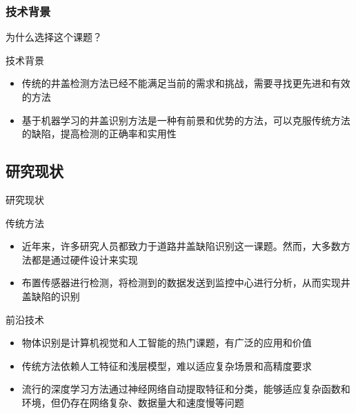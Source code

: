 \documentclass{beamer}
\begin{document}
\subsubsection{技术背景}
\begin{frame}{为什么选择这个课题？}
\begin{textbox}{技术背景}
    \begin{itemize}[<+-| alert@+>] %
        \item 传统的井盖检测方法已经不能满足当前的需求和挑战，需要寻找更先进和有效的方法
        \item 基于机器学习的井盖识别方法是一种有前景和优势的方法，可以克服传统方法的缺陷，提高检测的正确率和实用性
    \end{itemize}
    \end{textbox}
\end{frame}


\subsection{研究现状}

\begin{frame}{研究现状}
\begin{block}{传统方法}
	\begin{itemize}[<+-| alert@+>]
        \item 近年来，许多研究人员\cite{基于卷积神经网络的窨井盖检测,基于改进的卷积神经网络的道路井盖缺陷检测研究}都致力于道路井盖缺陷识别这一课题。然而，大多数方法都是通过硬件设计来实现
        \item 布置传感器进行检测，将检测到的数据发送到监控中心进行分析，从而实现井盖缺陷的识别
    \end{itemize}
\end{block}	
\begin{textbox}{前沿技术}
    \begin{itemize}[<+-| alert@+>]
        \item 物体识别是计算机视觉和人工智能的热门课题，有广泛的应用和价值
        \item 传统方法依赖人工特征和浅层模型，难以适应复杂场景和高精度要求
        \item 流行的深度学习方法通过神经网络自动提取特征和分类，能够适应复杂函数和环境，但仍存在网络复杂、数据量大和速度慢等问题
    \end{itemize}
    \end{textbox}
\end{frame}
\end{document}
